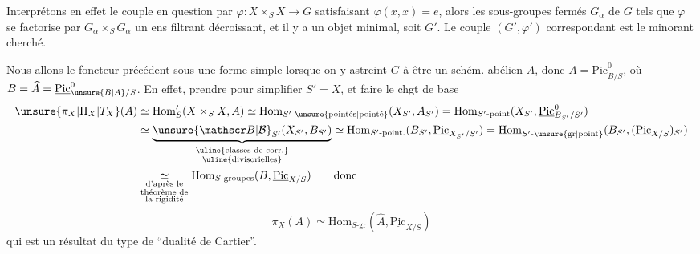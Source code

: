 Interprétons en effet le couple en question par
$\varphi:X\times_S X\longrightarrow G$ satisfaisant $\varphi(x,x)=e$, alors  les sous-groupes fermés $G_\alpha$ de $G$ tels que $\varphi$ se factorise par $G_\alpha\times_S G_\alpha$
 un ens filtrant décroissant, et 
il y a un objet minimal, soit $G'$. Le couple
$(G',\varphi')$ correspondant est le minorant cherché.

Nous allons
  le foncteur précédent  sous une
forme simple lorsque on y astreint $G$ à être un
schém. \uline{abélien} $A$, donc $A=\underline{\mathrm{Pic}}^0_{B/S}$, où $B=\widehat A=\underline{\mathrm{Pic}}^0_{\unsure{B|A}/S}$.
En effet,  
prendre pour simplifier $S'=X$, et faire le chgt de base  
\[
\begin{aligned}
\unsure{\pi_X|\Pi_X|T_X}(A)&\simeq\mathrm{Hom}'_S(X\times_S X,A)\simeq\mathrm{Hom}_{S'\text{-}\unsure{\mathrm{point\acute es}|\mathrm{point\acute e}}}(X_{S'},A_{S'})=\mathrm{Hom}_{S'\text{-}\mathrm{point}}(X_{S'},\underline{\mathrm{Pic}}^0_{B_{S'}/S'})\\
&\simeq\underbrace{\unsure{\mathscr B|\mathcal B}_{S'}(X_{S'},B_{S'})}_{\substack{\text{\uline{classes de corr.}}\\\text{\uline{divisorielles}}}}\simeq\mathrm{Hom}_{S'\text{-}\mathrm{point.}}(B_{S'},\underline{\mathrm{Pic}}_{X_{S'}/S'})=\underline{\mathrm{Hom}}_{S'\text{-}\unsure{\mathrm{gr}|\mathrm{point}}}(B_{S'},(\underline{\mathrm{Pic}}_{X/S})_{S'})\\
&\underset{\substack{\text{d'après le}\\\text{théorème de}\\\text{la rigidité}}}{\simeq}\mathrm{Hom}_{S\text{-groupes}}(B,\underline{\mathrm{Pic}}_{X/S})\qquad\text{donc}
\end{aligned}
\]
\[
\boxed{\pi_X(A)\simeq\mathrm{Hom}_{S\text{-gr}}(\widehat A,\underline{\mathrm{Pic}}_{X/S})}
\]
qui est un résultat du type de ``dualité de Cartier''.

